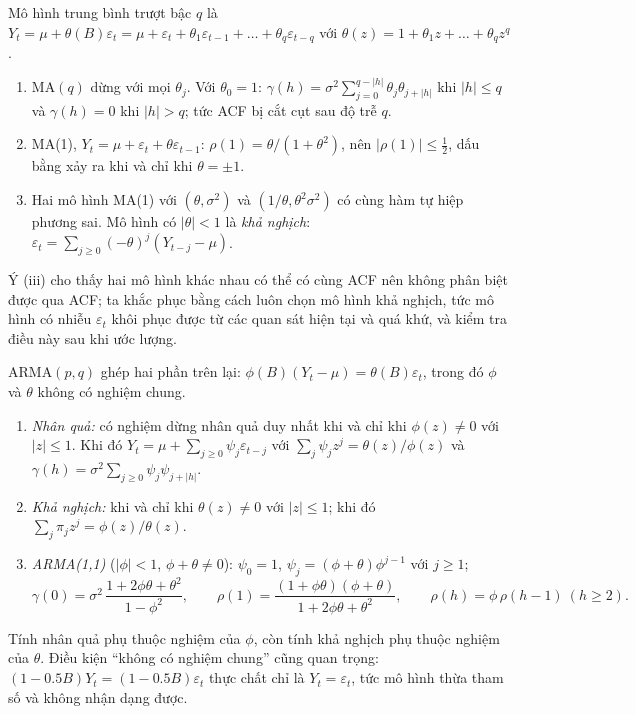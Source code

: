 Mô hình trung bình trượt bậc $q$ là $Y_t=\mu+\theta(B)\varepsilon_t=\mu+\varepsilon_t+\theta_1\varepsilon_{t-1}+\dots+\theta_q\varepsilon_{t-q}$ với $\theta(z)=1+\theta_1z+\dots+\theta_qz^q$.
\begin{kq}
\begin{enumerate}[label=(\roman*),leftmargin=*,itemsep=1pt]
\item MA$(q)$ dừng với mọi $\theta_j$. Với $\theta_0=1$: $\gamma(h)=\sigma^2\sum_{j=0}^{q-|h|}\theta_j\theta_{j+|h|}$ khi $|h|\le q$ và $\gamma(h)=0$ khi $|h|>q$; tức ACF bị cắt cụt sau độ trễ $q$.
\item MA(1), $Y_t=\mu+\varepsilon_t+\theta\varepsilon_{t-1}$: $\rho(1)=\theta/(1+\theta^2)$, nên $|\rho(1)|\le\tfrac12$, dấu bằng xảy ra khi và chỉ khi $\theta=\pm1$.
\item Hai mô hình MA(1) với $(\theta,\sigma^2)$ và $(1/\theta,\theta^2\sigma^2)$ có cùng hàm tự hiệp phương sai. Mô hình có $|\theta|<1$ là \emph{khả nghịch}: $\varepsilon_t=\sum_{j\ge0}(-\theta)^j(Y_{t-j}-\mu)$.
\end{enumerate}
\end{kq}
Ý (iii) cho thấy hai mô hình khác nhau có thể có cùng ACF nên không phân biệt được qua ACF; ta khắc phục bằng cách luôn chọn mô hình khả nghịch, tức mô hình có nhiễu $\varepsilon_t$ khôi phục được từ các quan sát hiện tại và quá khứ, và kiểm tra điều này sau khi ước lượng.

ARMA$(p,q)$ ghép hai phần trên lại: $\phi(B)(Y_t-\mu)=\theta(B)\varepsilon_t$, trong đó $\phi$ và $\theta$ không có nghiệm chung.
\begin{kq}
\begin{enumerate}[label=(\roman*),leftmargin=*,itemsep=1pt]
\item \emph{Nhân quả:} có nghiệm dừng nhân quả duy nhất khi và chỉ khi $\phi(z)\ne0$ với $|z|\le1$. Khi đó $Y_t=\mu+\sum_{j\ge0}\psi_j\varepsilon_{t-j}$ với $\sum_j\psi_jz^j=\theta(z)/\phi(z)$ và $\gamma(h)=\sigma^2\sum_{j\ge0}\psi_j\psi_{j+|h|}$.
\item \emph{Khả nghịch:} khi và chỉ khi $\theta(z)\ne0$ với $|z|\le1$; khi đó $\sum_j\pi_jz^j=\phi(z)/\theta(z)$.
\item \emph{ARMA(1,1)} ($|\phi|<1$, $\phi+\theta\ne0$): $\psi_0=1$, $\psi_j=(\phi+\theta)\phi^{j-1}$ với $j\ge1$;
\[
\gamma(0)=\sigma^2\,\frac{1+2\phi\theta+\theta^2}{1-\phi^2},\qquad \rho(1)=\frac{(1+\phi\theta)(\phi+\theta)}{1+2\phi\theta+\theta^2},\qquad \rho(h)=\phi\,\rho(h-1)\ (h\ge2).
\]
\end{enumerate}
\end{kq}
Tính nhân quả phụ thuộc nghiệm của $\phi$, còn tính khả nghịch phụ thuộc nghiệm của $\theta$. Điều kiện ``không có nghiệm chung'' cũng quan trọng: $(1-0.5B)Y_t=(1-0.5B)\varepsilon_t$ thực chất chỉ là $Y_t=\varepsilon_t$, tức mô hình thừa tham số và không nhận dạng được.

